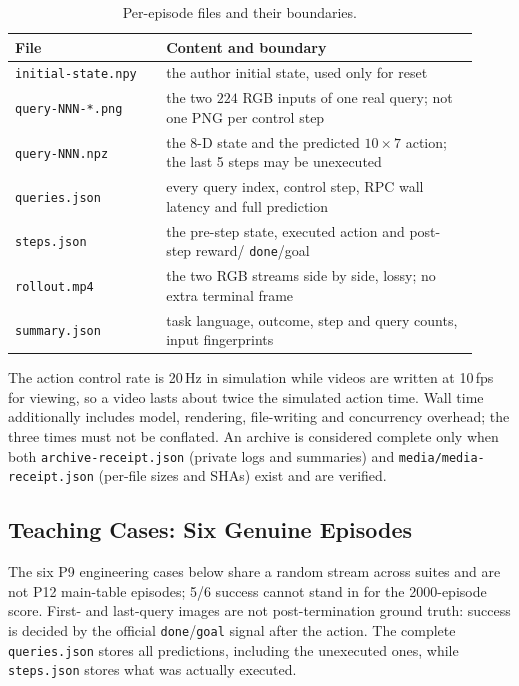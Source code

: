 \begin{table}[H]
  \centering
  \small
  \caption{Per-episode files and their boundaries.}
  \label{tab:pi05-files}
  \begin{tabular}{@{}p{0.30\linewidth}p{0.62\linewidth}@{}}
    \toprule
    File & Content and boundary \\
    \midrule
    \texttt{initial-state.npy} & the author initial state, used only for reset \\
    \texttt{query-NNN-*.png} & the two $224$ RGB inputs of one real query; not one PNG per control step \\
    \texttt{query-NNN.npz} & the 8-D state and the predicted $10 \times 7$ action; the last 5 steps may be unexecuted \\
    \texttt{queries.json} & every query index, control step, RPC wall latency and full prediction \\
    \texttt{steps.json} & the pre-step state, executed action and post-step reward/ \texttt{done}/goal \\
    \texttt{rollout.mp4} & the two RGB streams side by side, lossy; no extra terminal frame \\
    \texttt{summary.json} & task language, outcome, step and query counts, input fingerprints \\
    \bottomrule
  \end{tabular}
\end{table}

The action control rate is 20\,Hz in simulation while videos are written at
10\,fps for viewing, so a video lasts about twice the simulated action time.
Wall time additionally includes model, rendering, file-writing and concurrency
overhead; the three times must not be conflated. An archive is considered
complete only when both \texttt{archive-receipt.json} (private logs and
summaries) and \texttt{media/media-receipt.json} (per-file sizes and SHAs) exist
and are verified.

\subsection{Teaching Cases: Six Genuine Episodes}
\label{sec:pi05-cases}

The six P9 engineering cases below share a random stream across suites and are
not P12 main-table episodes; 5/6 success cannot stand in for the 2000-episode
score. First- and last-query images are not post-termination ground truth:
success is decided by the official \texttt{done}/\texttt{goal} signal after the
action. The complete \texttt{queries.json} stores all predictions, including
the unexecuted ones, while \texttt{steps.json} stores what was actually
executed.

